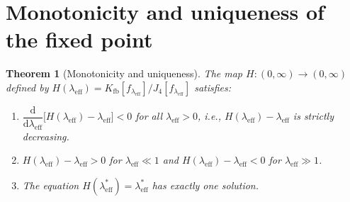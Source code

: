 \documentclass[11pt,a4paper]{article}
\newcommand{\leff}{\lambda_{\mathrm{eff}}}
\newcommand{\Kfb}{K_{\mathrm{fb}}}
\newcommand{\Jfour}{J_{4}}
\newtheorem{theorem}{Theorem}[section]
\theoremstyle{remark}
\begin{document}
\section{Monotonicity and uniqueness of the fixed point}
\label{P2:sec:monotone}

\begin{theorem}[Monotonicity and uniqueness]
\label{P2:thm:mono}
The map $H\colon(0,\infty)\to(0,\infty)$ defined by
$H(\leff) = \Kfb[f_{\leff}]/\Jfour[f_{\leff}]$
satisfies:
\begin{enumerate}[label=\textup{(\roman*)}]
  \item $\dfrac{\mathrm{d}}{\mathrm{d}\leff}\bigl[H(\leff)-\leff\bigr] < 0$
    for all $\leff>0$, i.e., $H(\leff)-\leff$ is strictly decreasing.
  \item $H(\leff)-\leff > 0$ for $\leff \ll 1$ and
    $H(\leff)-\leff < 0$ for $\leff \gg 1$.
  \item The equation $H(\leff^*)=\leff^*$ has exactly one solution.
\end{enumerate}
\end{theorem}
\end{document}

